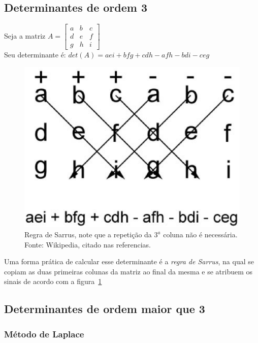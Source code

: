   \subsection{Determinantes de ordem 3}
  
Seja a matriz $A=\begin{bmatrix}
     a & b & c\\d & e & f\\g & h & i
   \end{bmatrix}$\\
   Seu determinante é: $det(A)=aei+bfg+cdh-afh-bdi-ceg$\\
   \begin{figure}[t]
   \centering
     \includegraphics[scale=0.3]{Determinant_3x3-wikipedia.eps}
     \caption{Regra de Sarrus, note que a repetição da $3^a$ coluna não é necessária. Fonte: Wikipedia, citado nas referencias.}
     \label{fig1}
   \end{figure}
Uma forma prática de calcular esse determinante é a \textit{regra de Sarrus}, na qual se copiam as duas primeiras 
colunas da matriz ao final da mesma e se atribuem os sinais de acordo com a figura~\ref{fig1}
   
   \subsection{Determinantes de ordem maior que 3}
   \subsubsection*{Método de Laplace}
